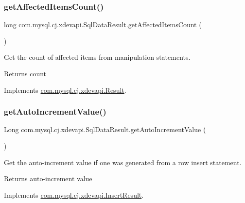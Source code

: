 \subsubsection{\texorpdfstring{get\+Affected\+Items\+Count()}{getAffectedItemsCount()}}
{\footnotesize\ttfamily long com.\+mysql.\+cj.\+xdevapi.\+Sql\+Data\+Result.\+get\+Affected\+Items\+Count (\begin{DoxyParamCaption}{ }\end{DoxyParamCaption})}

Get the count of affected items from manipulation statements.

\begin{DoxyReturn}{Returns}
count 
\end{DoxyReturn}


Implements \mbox{\hyperlink{interfacecom_1_1mysql_1_1cj_1_1xdevapi_1_1_result_a6389cfd50f26c8efc0120b5f3072d228}{com.\+mysql.\+cj.\+xdevapi.\+Result}}.

\mbox{\label{classcom_1_1mysql_1_1cj_1_1xdevapi_1_1_sql_data_result_aa6d3e3de7bb565c7086d71b0242c77d9}} 
\subsubsection{\texorpdfstring{get\+Auto\+Increment\+Value()}{getAutoIncrementValue()}}
{\footnotesize\ttfamily Long com.\+mysql.\+cj.\+xdevapi.\+Sql\+Data\+Result.\+get\+Auto\+Increment\+Value (\begin{DoxyParamCaption}{ }\end{DoxyParamCaption})}

Get the auto-\/increment value if one was generated from a row insert statement.

\begin{DoxyReturn}{Returns}
auto-\/increment value 
\end{DoxyReturn}


Implements \mbox{\hyperlink{interfacecom_1_1mysql_1_1cj_1_1xdevapi_1_1_insert_result_a32144e23568f91aa21dab0b01cb6b14e}{com.\+mysql.\+cj.\+xdevapi.\+Insert\+Result}}.

